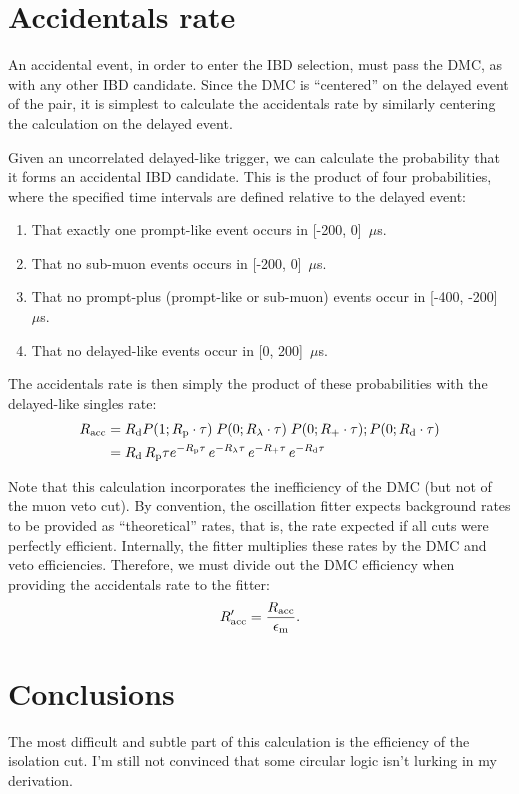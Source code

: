 \documentclass[../thesis.tex]{subfiles}
\begin{document}
\section{Accidentals rate}
\label{sec:accratecalc}

An accidental event, in order to enter the IBD selection, must pass the DMC, as with any other IBD candidate. Since the DMC is ``centered'' on the delayed event of the pair, it is simplest to calculate the accidentals rate by similarly centering the calculation on the delayed event.

Given an uncorrelated delayed-like trigger, we can calculate the probability that it forms an accidental IBD candidate. This is the product of four probabilities, where the specified time intervals are defined relative to the delayed event:

\begin{enumerate}
\item That exactly one prompt-like event occurs in [-200, 0]~$\mu$s.
\item That no sub-muon events occurs in [-200, 0]~$\mu$s.
\item That no prompt-plus (prompt-like or sub-muon) events occur in [-400, -200]~$\mu$s.
\item That no delayed-like events occur in [0, 200]~$\mu$s.
\end{enumerate}

\def\Racc{\ensuremath{R_\mathrm{acc}}}

The accidentals rate is then simply the product of these probabilities with the delayed-like singles rate:
\begin{align}
  \Racc &= \Rdel P(1; \Rpro \cdot \tau)\;P(0; \Rsub \cdot \tau)\;P(0; \Rplu \cdot \tau);P(0; \Rdel \cdot \tau) \nonumber \\
        &= \Rdel\,\Rpro\tau e^{-\Rpro\tau}\,e^{-\Rsub\tau}\,e^{-\Rplu\tau}\,e^{-\Rdel\tau}
\end{align}

Note that this calculation incorporates the inefficiency of the DMC (but not of the muon veto cut). By convention, the oscillation fitter expects background rates to be provided as ``theoretical'' rates, that is, the rate expected if all cuts were perfectly efficient. Internally, the fitter multiplies these rates by the DMC and veto efficiencies. Therefore, we must divide out the DMC efficiency when providing the accidentals rate to the fitter:
\begin{equation}
  \Racc' = \frac{\Racc}{\edmc}.
\end{equation}

\section{Conclusions}
\label{sec:accdmcconcl}

The most difficult and subtle part of this calculation is the efficiency of the isolation cut. I'm still not convinced that some circular logic isn't lurking in my derivation.
\end{document}
